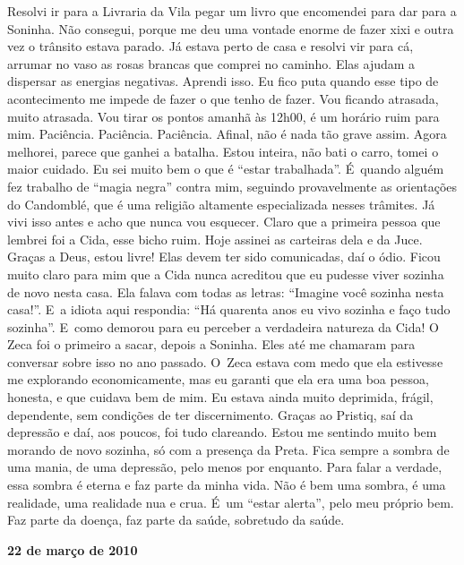 Resolvi ir para a Livraria da Vila pegar um livro que encomendei para
dar para a Soninha. Não consegui, porque me deu uma vontade enorme de
fazer xixi e outra vez o trânsito estava parado. Já estava perto de casa
e resolvi vir para cá, arrumar no vaso as rosas brancas que comprei no
caminho. Elas ajudam a dispersar as energias negativas. Aprendi isso. Eu
fico puta quando esse tipo de acontecimento me impede de fazer o que
tenho de fazer. Vou ficando atrasada, muito atrasada. Vou tirar os
pontos amanhã às 12h00, é um horário ruim para mim. Paciência.
Paciência. Paciência. Afinal, não é nada tão grave assim. Agora melhorei,
parece que ganhei a batalha. Estou inteira, não bati o carro, tomei o
maior cuidado. Eu sei muito bem o que é ``estar trabalhada''. É~quando
alguém fez trabalho de ``magia negra'' contra mim, seguindo
provavelmente as orientações do Candomblé, que é uma religião altamente
especializada nesses trâmites. Já vivi isso antes e acho que nunca vou
esquecer. Claro que a primeira pessoa que lembrei foi a Cida, esse bicho
ruim. Hoje assinei as carteiras dela e da Juce. Graças a Deus, estou
livre! Elas devem ter sido comunicadas, daí o ódio. Ficou muito claro
para mim que a Cida nunca acreditou que eu pudesse viver sozinha de novo
nesta casa. Ela falava com todas as letras: ``Imagine você sozinha nesta
casa!''. E~a idiota aqui respondia: ``Há quarenta anos eu vivo sozinha e
faço tudo sozinha''. E~como demorou para eu perceber a verdadeira
natureza da Cida! O Zeca foi o primeiro a sacar, depois a Soninha. Eles
até me chamaram para conversar sobre isso no ano passado. O~Zeca estava
com medo que ela estivesse me explorando economicamente, mas eu garanti
que ela era uma boa pessoa, honesta, e que cuidava bem de mim. Eu estava
ainda muito deprimida, frágil, dependente, sem condições de ter
discernimento. Graças ao Pristiq, saí da depressão e daí, aos poucos,
foi tudo clareando. Estou me sentindo muito bem morando de novo sozinha,
só com a presença da Preta. Fica sempre a sombra de uma mania, de uma
depressão, pelo menos por enquanto. Para falar a verdade, essa sombra é
eterna e faz parte da minha vida. Não é bem uma sombra, é uma realidade,
uma realidade nua e crua. É~um ``estar alerta'', pelo meu próprio bem.
Faz parte da doença, faz parte da saúde, sobretudo da saúde.

\begin{center}\textbf{\asterisc{}}\end{center}


\begin{flushright}\textbf{22 de março de 2010}\end{flushright}


